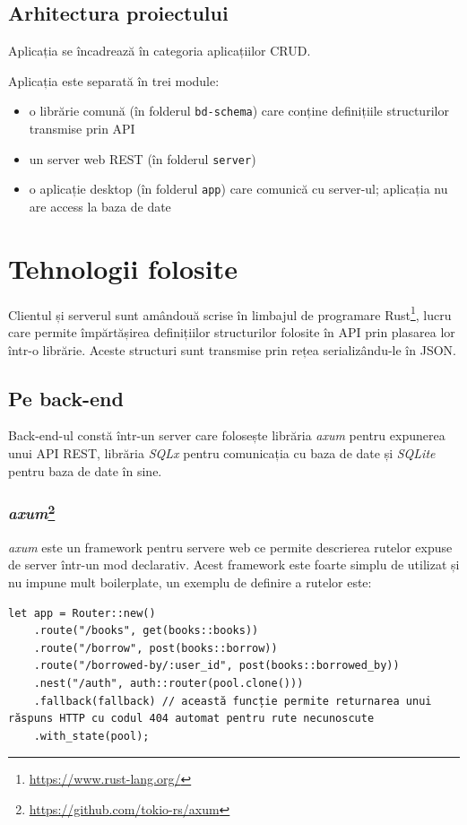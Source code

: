 \documentclass{article}
\begin{document}
    \subsection{Arhitectura proiectului}

    Aplicația se încadrează în categoria aplicațiilor CRUD.

    Aplicația este separată în trei module:
    \begin{itemize}
        \item o librărie comună (în folderul \texttt{bd-schema}) care conține definițiile structurilor
        transmise prin API
        \item un server web REST (în folderul \texttt{server})
        \item o aplicație desktop (în folderul \texttt{app}) care comunică cu server-ul; aplicația nu are access la baza de date
    \end{itemize}

    \section{Tehnologii folosite}

    Clientul și serverul sunt amândouă scrise în limbajul de programare Rust\footnote{\url{https://www.rust-lang.org/}},
    lucru care permite împărtășirea definițiilor structurilor folosite în API prin plasarea lor într-o librărie.
    Aceste structuri sunt transmise prin rețea serializându-le în JSON.

    \subsection{Pe back-end}

    Back-end-ul constă într-un server care folosește librăria \emph{axum} pentru expunerea unui API REST,
    librăria \emph{SQLx} pentru comunicația cu baza de date și \emph{SQLite} pentru baza de date în sine.

    \subsubsection*{\emph{axum}\footnote{\url{https://github.com/tokio-rs/axum}}}

    \emph{axum} este un framework pentru servere web ce permite descrierea rutelor expuse de server într-un mod
    declarativ. Acest framework este foarte simplu de utilizat și nu impune mult boilerplate, un exemplu de definire
    a rutelor este:
    \begin{verbatim}
let app = Router::new()
    .route("/books", get(books::books))
    .route("/borrow", post(books::borrow))
    .route("/borrowed-by/:user_id", post(books::borrowed_by))
    .nest("/auth", auth::router(pool.clone()))
    .fallback(fallback) // această funcție permite returnarea unui răspuns HTTP cu codul 404 automat pentru rute necunoscute
    .with_state(pool);
    \end{verbatim}
\end{document}
